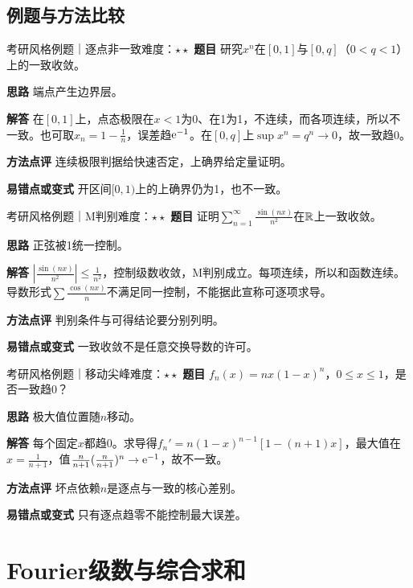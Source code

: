 \subsection{例题与方法比较}
\begin{example}{考研风格例题｜逐点非一致}{难度：$\star\star$}
\label{ex:9:10}\textbf{题目} 研究$x^n$在$[0,1]$与$[0,q]$（$0<q<1$）上的一致收敛。\par
\textbf{思路} 端点产生边界层。\par
\textbf{解答} 在$[0,1]$上，点态极限在$x<1$为0、在1为1，不连续，而各项连续，所以不一致。也可取$x_n=1-\frac{1}{n}$，误差趋$\mathrm{e}^{-1}$。在$[0,q]$上$\sup x^n=q^n\to0$，故一致趋0。\par
\textbf{方法点评} 连续极限判据给快速否定，上确界给定量证明。\par
\textbf{易错点或变式} 开区间$[0,1)$上的上确界仍为1，也不一致。
\end{example}
\begin{example}{考研风格例题｜M判别}{难度：$\star\star$}
\label{ex:9:11}\textbf{题目} 证明$\sum_{n=1}^{\infty}\frac{\sin(nx)}{n^2}$在$\mathbb{R}$上一致收敛。\par
\textbf{思路} 正弦被1统一控制。\par
\textbf{解答} $|\frac{\sin(nx)}{n^2}|\le\frac{1}{n^2}$，控制级数收敛，M判别成立。每项连续，所以和函数连续。导数形式$\sum\frac{\cos(nx)}{n}$不满足同一控制，不能据此宣称可逐项求导。\par
\textbf{方法点评} 判别条件与可得结论要分别列明。\par
\textbf{易错点或变式} 一致收敛不是任意交换导数的许可。
\end{example}
\begin{example}{考研风格例题｜移动尖峰}{难度：$\star\star$}
\label{ex:9:12}\textbf{题目} $f_n(x)=nx(1-x)^n$，$0\le x\le1$，是否一致趋0？\par
\textbf{思路} 极大值位置随$n$移动。\par
\textbf{解答} 每个固定$x$都趋0。求导得$f_n\prime=n(1-x)^{n-1}[1-(n+1)x]$，最大值在$x=\frac{1}{n+1}$，值$\frac n{n+1}(\frac n{n+1})^n\to\mathrm{e}^{-1}$，故不一致。\par
\textbf{方法点评} 坏点依赖$n$是逐点与一致的核心差别。\par
\textbf{易错点或变式} 只有逐点趋零不能控制最大误差。
\end{example}
\section{Fourier级数与综合求和}\label{sec:9:5}


